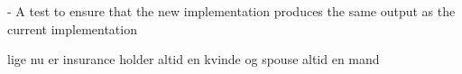 - A test to ensure that the new implementation produces the same output as the current implementation


lige nu er insurance holder altid en kvinde og spouse altid en mand \\